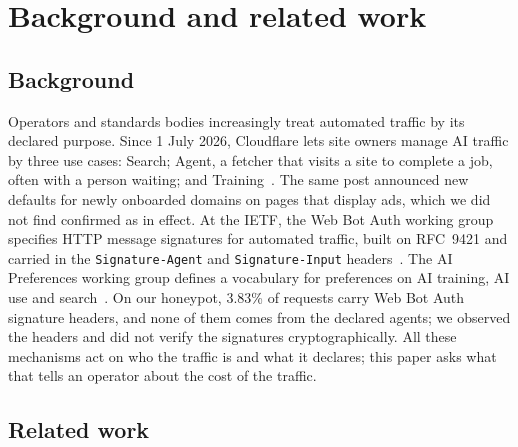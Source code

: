 \section{Background and related work}\label{sec:related}

\subsection{Background}\label{sec:background}
Operators and standards bodies increasingly treat automated traffic by its declared
purpose.
Since 1 July 2026, Cloudflare lets site owners manage AI traffic by three use cases:
Search; Agent, a fetcher that visits a site to complete a job, often with a person
waiting; and Training~\cite{cloudflare2026options}.
The same post announced new defaults for newly onboarded domains on pages that display
ads, which we did not find confirmed as in effect.
At the IETF, the Web Bot Auth working group specifies HTTP message signatures for
automated traffic, built on RFC~9421 and carried in the \texttt{Signature-Agent} and
\texttt{Signature-Input} headers~\cite{ietf-webbotauth}.
The AI Preferences working group defines a vocabulary for preferences on AI training, AI
use and search~\cite{ietf-aipref-vocab}.
On our honeypot, 3.83\% of requests carry Web Bot Auth signature headers, and none of them
comes from the declared agents; we observed the headers and did not verify the signatures
cryptographically.
All these mechanisms act on who the traffic is and what it declares; this paper asks
what that tells an operator about the cost of the traffic.

\subsection{Related work}\label{sec:rw}
